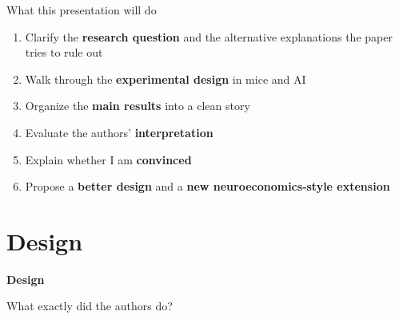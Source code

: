 \documentclass[aspectratio=169,11pt]{beamer}
\newcommand{\sectiondivider}[2]{
  \begin{frame}[plain]
    \vfill
    {\color{accentblue}\LARGE\bfseries #1\par}
    \vspace{0.5em}
    {\large #2\par}
    \vfill
  \end{frame}
}
\begin{document}
\begin{frame}{What this presentation will do}
\begin{enumerate}
  \item Clarify the \textbf{research question} and the alternative explanations the paper tries to rule out
  \item Walk through the \textbf{experimental design} in mice and AI
  \item Organize the \textbf{main results} into a clean story
  \item Evaluate the authors' \textbf{interpretation}
  \item Explain whether I am \textbf{convinced}
  \item Propose a \textbf{better design} and a \textbf{new neuroeconomics-style extension}
\end{enumerate}
\end{frame}

\section{Design}
\sectiondivider{Design}{What exactly did the authors do?}
\end{document}
